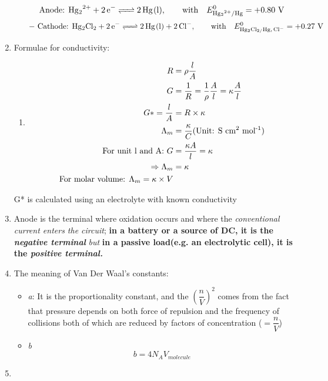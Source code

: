 \documentclass{article}
\numberwithin{equation}{section}
\numberwithin{figure}{section}
\newcommand{\Cr}{\times}
\begin{document}
\begin{enumerate}
\begin{enumerate}
\begin{equation}
					\text{Anode: }	{\displaystyle {\ce {Hg2^2+ + 2e^- <=> 2Hg(l)}},\qquad {\ce {with}}\quad E_{{\ce {Hg2^2+/Hg}}}^{0}=+0.80\ {\ce {V}}}
				\end{equation}
				\begin{equation}
				- \text{ Cathode: }	{\displaystyle {\ce {Hg2Cl2 + 2e^- <=> 2Hg(l) + 2Cl^-}},\qquad {\ce {with}}\quad E_{{\ce {Hg2Cl2/Hg, Cl-}}}^{0}=+0.27\ {\ce {V}}}
				\end{equation}
		\end{enumerate}
	\item Formulae for conductivity:
		\begin{enumerate}
			\item \begin{align}
					R &=\rho\frac{l}{A}\\
					G &=\frac{1}{R} = \frac{1}{\rho}\frac{A}{l}=\kappa \frac{A}{l}\\
					G*=\frac{l}{A} &=R\Cr\kappa\\			
					\Lambda_{m} &=\frac{\kappa}{C}(\text{Unit: S cm\textsuperscript{2} mol\textsuperscript{-1}})\\
					\text{For unit l and A: } G &= \frac{\kappa A}{l}=\kappa\\
					\Rightarrow \Lambda_{m}&=\kappa\\
					\text{For molar volume:  } \Lambda_{m}=\kappa\Cr V	
			\end{align}
		\end{enumerate}
G* is calculated using an electrolyte with known conductivity
	\item Anode is the terminal where oxidation occurs and where the \emph{conventional current enters the circuit};\textbf{ in a battery or a source of DC, it is the \emph{negative terminal }} \emph{but} \textbf{in a passive load(e.g. an electrolytic cell), it is the \emph{positive terminal.}}
	\item The meaning of Van Der Waal's constants:
		\begin{itemize}
			\item \emph{a}: It is the proportionality constant, and the $\left(\dfrac{n}{V}\right)^2$ comes from the fact that pressure depends on both force of repulsion and the frequency of collisions both of which are reduced by factors of concentration ($=\dfrac{n}{V}$)
			\item \emph{b}	$$ b=4N_{A} V_{molecule} $$
		\end{itemize}
	\item \begin{table}[h!]

\end{table}
\end{enumerate}
\end{document}
